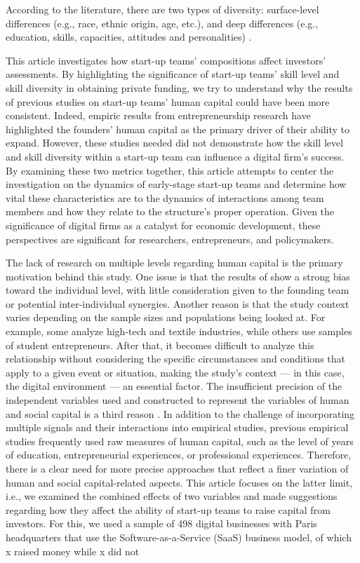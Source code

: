 \documentclass[12pt]{article}
\begin{document}
According to the literature, there are two types of diversity: surface-level differences (e.g., race, ethnic origin, age, etc.), and deep differences (e.g., education, skills, capacities, attitudes and personalities) \citep{bell2007deep}.

This article investigates how start-up teams' compositions affect investors' assessments. By highlighting the significance of start-up teams' skill level and skill diversity in obtaining private funding, we try to understand why the results of previous studies on start-up teams' human capital could have been more consistent. Indeed, empiric results from entrepreneurship research have highlighted the founders' human capital as the primary driver of their ability to expand. However, these studies needed did not demonstrate how the skill level and skill diversity within a start-up team can influence a digital firm's success. By examining these two metrics together, this article attempts to center the investigation on the dynamics of early-stage start-up teams and determine how vital these characteristics are to the dynamics of interactions among team members and how they relate to the structure's proper operation. Given the significance of digital firms as a catalyst for economic development, these perspectives are significant for researchers, entrepreneurs, and policymakers.

The lack of research on multiple levels regarding human capital is the primary motivation behind this study. One issue is that the results of \citep{marvel2016human} show a strong bias toward the individual level, with little consideration given to the founding team or potential inter-individual synergies. Another reason is that the study context varies depending on the sample sizes and populations being looked at. For example, some analyze high-tech and textile industries, while others use samples of student entrepreneurs. After that, it becomes difficult to analyze this relationship without considering the specific circumstances and conditions that apply to a given event or situation, making the study's context — in this case, the digital environment — an essential factor. The insufficient precision of the independent variables used and constructed to represent the variables of human and social capital is a third reason \citep{harrison2007s}. In addition to the challenge of incorporating multiple signals and their interactions into empirical studies, previous empirical studies frequently used raw measures of human capital, such as the level of years of education, entrepreneurial experiences, or professional experiences. Therefore, there is a clear need for more precise approaches that reflect a finer variation of human and social capital-related aspects. This article focuses on the latter limit, i.e., we examined the combined effects of two variables and made suggestions regarding how they affect the ability of start-up teams to raise capital from investors. For this, we used a sample of 498 digital businesses with Paris headquarters that use the Software-as-a-Service (SaaS) business model, of which x raised money while x did not
\end{document}
